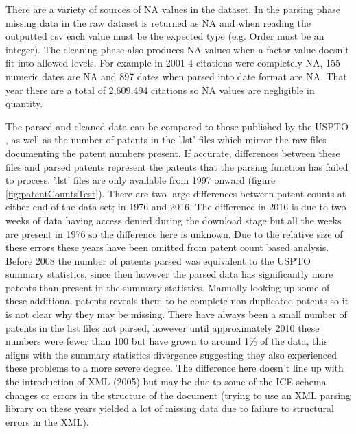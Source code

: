 There are a variety of sources of NA values in the dataset. In the parsing phase missing data in the raw dataset is returned as NA and when reading the outputted csv each value must be the expected type (e.g. Order must be an integer). The cleaning phase also produces NA values when a factor value doesn't fit into allowed levels. For example in 2001 4 citations were completely NA, 155 numeric dates are NA and 897 dates when parsed into date format are NA. That year there are a total of 2,609,494 citations so NA values are negligible in quantity. 

The parsed and cleaned data can be compared to those published by the USPTO \cite{USPTOSummary}, as well as the number of patents in the '.lst' files which mirror the raw files documenting the patent numbers present. If accurate, differences between these files and parsed patents represent the patents that the parsing function has failed to process. '.lst' files are only available from 1997 onward (figure \ref{fig:patentCountsTest}). There are two large differences between patent counts at either end of the data-set; in 1976 and 2016. The difference in 2016 is due to two weeks of data having access denied during the download stage but all the weeks are present in 1976 so the difference here is unknown. Due to the relative size of these errors these years have been omitted from patent count based analysis. Before 2008 the number of patents parsed was equivalent to the USPTO summary statistics, since then however the parsed data has significantly more patents than present in the summary statistics. Manually looking up some of these additional patents reveals them to be complete non-duplicated patents so it is not clear why they may be missing. There have always been a small number of patents in the list files not parsed, however until approximately 2010 these numbers were fewer than 100 but have grown to around 1\% of the data, this aligns with the summary statistics divergence suggesting they also experienced these problems to a more severe degree. The difference here doesn't line up with the introduction of XML (2005) but may be due to some of the ICE schema changes or errors in the structure of the document (trying to use an XML parsing library on these years yielded a lot of missing data due to failure to structural errors in the XML). 

